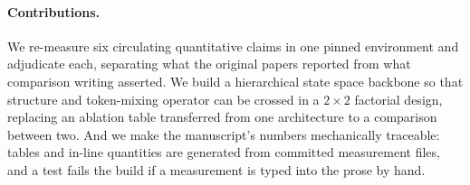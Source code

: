 \paragraph{Contributions.} We re-measure six circulating quantitative claims
in one pinned environment and adjudicate each, separating what the original
papers reported from what comparison writing asserted. We build a
hierarchical state space backbone so that structure and token-mixing operator
can be crossed in a $2\times2$ factorial design, replacing an ablation table
transferred from one architecture to a comparison between two. And we make
the manuscript's numbers mechanically traceable: tables and in-line
quantities are generated from committed measurement files, and a test fails
the build if a measurement is typed into the prose by hand.
